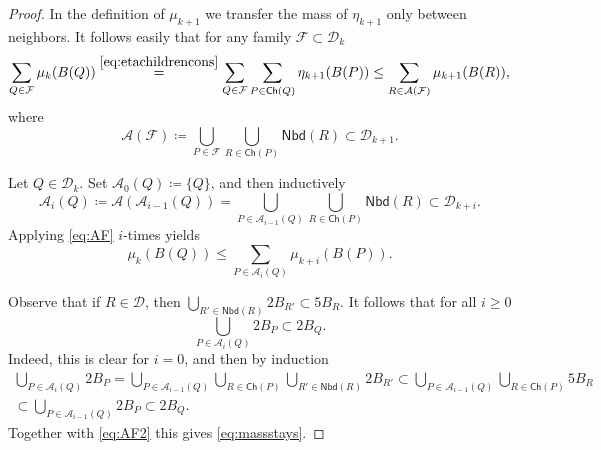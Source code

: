 \documentclass[11pt,reqno]{amsart}
\def\dA{{\mathcal{A}}}
\def\dF{{\mathcal{F}}}
\theoremstyle{definition}
\theoremstyle{remark}
\numberwithin{equation}{section}
\newcommand{\DD}{\mathcal{D}}
\newcommand{\Child}{\mathsf{Ch}}
\newcommand{\Nei}{\mathsf{Nbd}}
\theoremstyle{theorem}
\theoremstyle{definition}
\theoremstyle{remark}
\numberwithin{equation}{section}
\begin{document}
\begin{proof}
	In the definition of $\mu_{k+1}$ we transfer the mass of $\eta_{k+1}$ only between neighbors. It follows easily that for any family $\dF\subset\DD_k$
	\begin{equation}\label{eq:AF}
	\sum_{Q\in\dF}\mu_{k}(B(Q)) \overset{\eqref{eq:etachildrencons}}{=} \sum_{Q\in\dF}\sum_{P\in\Child(Q)}\eta_{k+1}(B(P))\le \sum_{R\in\mathcal{A}(\dF)}\mu_{k+1}(B(R)),
	\end{equation}
	where
	\begin{equation*}
	\mathcal{A}(\dF)\coloneqq \bigcup_{P\in\mathcal{F}}\bigcup_{R\in\Child(P)}\Nei(R)\subset\DD_{k+1}.
	\end{equation*}
	
	Let $Q\in\DD_k$. Set $\mathcal{A}_0(Q)\coloneqq\{Q\}$, and then inductively
	\begin{equation*}
	\mathcal{A}_i(Q) \coloneqq \mathcal{A}(\mathcal{A}_{i-1}(Q))= \bigcup_{P\in\mathcal{A}_{i-1}(Q)}\bigcup_{R\in\Child(P)}\Nei(R)\subset \DD_{k+i}.
	\end{equation*}
	Applying \eqref{eq:AF} $i$-times yields
	\begin{equation}\label{eq:AF2}
	\mu_k(B(Q))\le \sum_{P\in\dA_i(Q)}\mu_{k+i}(B(P)).
	\end{equation}
	
	Observe that if $R\in\DD$, then $\bigcup_{R'\in \Nei(R)}2B_{R'} \subset 5B_R$. It follows that for all $i\ge 0$
	\begin{equation*}
	\bigcup_{P\in\dA_i(Q)}2B_P \subset 2B_Q.
	\end{equation*}
	Indeed, this is clear for $i=0$, and then by induction
	\begin{multline*}
	\bigcup_{P\in\dA_i(Q)}2B_P = \bigcup_{P\in\mathcal{A}_{i-1}(Q)}\bigcup_{R\in\Child(P)}\bigcup_{R'\in \Nei(R)}2B_{R'} \subset \bigcup_{P\in\mathcal{A}_{i-1}(Q)}\bigcup_{R\in\Child(P)} 5B_R\\
	\subset \bigcup_{P\in\mathcal{A}_{i-1}(Q)} 2B_P \subset 2B_Q.
	\end{multline*}
	Together with \eqref{eq:AF2} this gives \eqref{eq:massstays}.
	

\end{proof}
\end{document}
